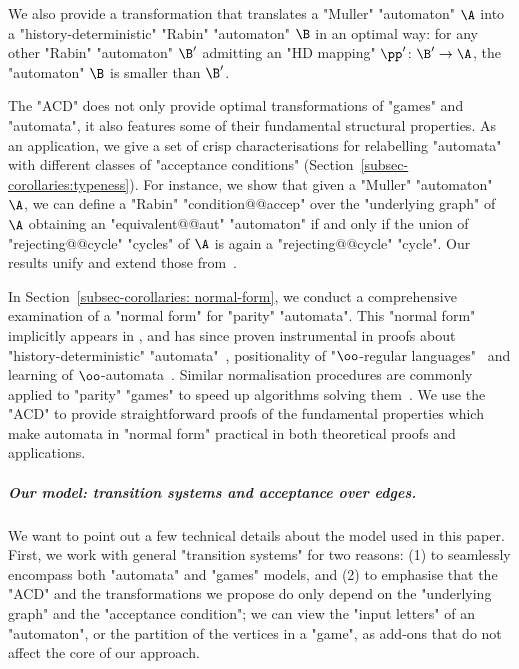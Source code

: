 \documentclass{theoretics}
\newenvironment{longdescription} %
{\begin{description}[style=unboxed]}
	{\end{description}}
\begin{document}
\begin{longdescription}
	We also provide a transformation that translates a "Muller" "automaton" $\A$ into a "history-deterministic" "Rabin" "automaton" $\B$ in an optimal way: for any other "Rabin" "automaton" $\B'$ admitting an "HD mapping" $\pp'\colon \B'\to \A$, the "automaton" $\B$ is smaller than $\B'$.
	
	\item[4. Structural results for Muller transition systems.] The "ACD" does not only provide optimal transformations of "games" and "automata", it also features some of their fundamental structural properties. 
	As an application, we give a set of crisp characterisations for relabelling "automata" with different classes of "acceptance conditions" (Section~\ref{subsec-corollaries:typeness}). For instance,  we show that given a "Muller" "automaton" $\A$, we can define a "Rabin" "condition@@accep" over the "underlying graph" of $\A$ obtaining an "equivalent@@aut" "automaton" if and only if the union of "rejecting@@cycle" "cycles" of $\A$ is again a "rejecting@@cycle" "cycle". Our results unify and extend those from~\cite{BSW01Weakautomata,BKS10Paritizing,KPB94DetOmega,Zielonka1998infinite}.
	
	In Section~\ref{subsec-corollaries: normal-form}, we conduct a comprehensive examination of a "normal form" for "parity" "automata". This "normal form" implicitly appears in \cite{CartonMaceiras99RabinIndex}, and has since proven instrumental in proofs about "history-deterministic" "automata"~\cite{AK22MinimizingGFG,EhlersSchewe22NaturalColors,KS15DeterminisationGFG}, positionality of "$\oo$-regular languages"~\cite{BCRV22HalfPosBuchi} and learning of $\oo$-automata~\cite{BohnLoding23DetParityFromExamples}. Similar normalisation procedures are commonly applied to "parity" "games" to speed up algorithms solving them~\cite{FriedmannM09ParityGames}. We use the "ACD" to provide straightforward proofs of the fundamental properties which make automata in "normal form" practical in both theoretical proofs and applications.	
\end{longdescription}


\subparagraph*{Our model: transition systems and acceptance over edges.} We want to point out a few technical details about the model used in this paper. First, we work with general "transition systems" for two reasons: (1) to seamlessly encompass both "automata" and "games" models, and (2) to emphasise that the "ACD" and the transformations we propose do only depend on the "underlying graph" and the "acceptance condition"; we can view the "input letters" of an "automaton", or the partition of the vertices in a "game", as add-ons that do not affect the core of our approach.
\end{document}
